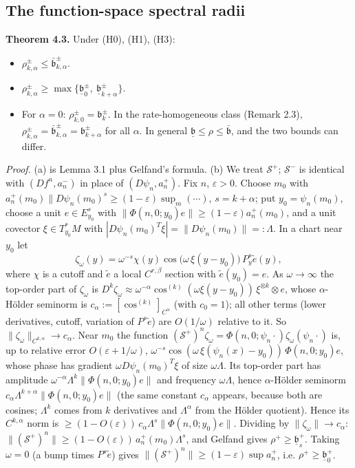 \documentclass[11pt,a4paper]{article}
\theoremstyle{plain}
\theoremstyle{definition}
\theoremstyle{remark}
\numberwithin{equation}{section}
\numberwithin{figure}{section}
\begin{document}
\subsection{The function-space spectral radii}

\textbf{Theorem 4.3.} Under (H0), (H1), (H3):
\begin{itemize}
    \item[(a)] $\rho^\pm_{k,\alpha}\le\bar{\mathfrak b}^\pm_{k,\alpha}$.
    \item[(b)] $\rho^\pm_{k,\alpha}\ge\max\{\underline{\mathfrak b}^\pm_0,\ \underline{\mathfrak b}^\pm_{k+\alpha}\}$.
    \item[(c)] For $\alpha=0$: $\rho^\pm_{k,0}=\mathfrak b^\pm_k$. In the rate-homogeneous class (Remark 2.3), $\rho^\pm_{k,\alpha}=\bar{\mathfrak b}^\pm_{k,\alpha}=\mathfrak b^\pm_{k+\alpha}$ for all $\alpha$. In general $\underline{\mathfrak b}\le\rho\le\bar{\mathfrak b}$, and the two bounds can differ.
\end{itemize}

\textit{Proof.} (a) is Lemma 3.1 plus Gelfand's formula. (b) We treat $\mathcal S^+$; $\mathcal S^-$ is identical with $(Df^n,a^-_n)$ in place of $(D\psi_n,a^+_n)$. Fix $n$, $\varepsilon>0$. Choose $m_0$ with $a^+_n(m_0)\|D\psi_n(m_0)^s\ge(1-\varepsilon)\sup_m(\cdots)$, $s=k+\alpha$; put $y_0=\psi_n(m_0)$, choose a unit $e\in E^s_{y_0}$ with $\|\Phi(n,0;y_0)e\|\ge(1-\varepsilon)a^+_n(m_0)$, and a unit covector $\xi\in T^*_{y_0}M$ with $|D\psi_n(m_0)^{T}\xi|=\|D\psi_n(m_0)\|=:\Lambda$. In a chart near $y_0$ let
\[
\zeta_\omega(y)=\omega^{-s}\chi(y)\cos\big(\omega\,\xi(y-y_0)\big)\,P^s_y\tilde e(y),
\]
where $\chi$ is a cutoff and $\tilde e$ a local $C^{r,\beta}$ section with $\tilde e(y_0)=e$. As $\omega\to\infty$ the top-order part of $\zeta_\omega$ is $D^k\zeta_\omega\approx\omega^{-\alpha}\cos^{(k)}(\omega\xi(y-y_0))\,\xi^{\otimes k}\otimes e$, whose $\alpha$-Hölder seminorm is $c_\alpha:=[\cos^{(k)}]_{C^\alpha}$ (with $c_0=1$); all other terms (lower derivatives, cutoff, variation of $P^s\tilde e$) are $O(1/\omega)$ relative to it. So $\|\zeta_\omega\|_{C^{k,\alpha}}\to c_\alpha$. Near $m_0$ the function $(\mathcal S^+)^n\zeta_\omega=\Phi(n,0;\psi_n\cdot)\zeta_\omega(\psi_n\cdot)$ is, up to relative error $O(\varepsilon+1/\omega)$, $\omega^{-s}\cos(\omega\,\xi(\psi_n(x)-y_0))\,\Phi(n,0;y_0)e$, whose phase has gradient $\omega D\psi_n(m_0)^T\xi$ of size $\omega\Lambda$. Its top-order part has amplitude $\omega^{-\alpha}\Lambda^k\|\Phi(n,0;y_0)e\|$ and frequency $\omega\Lambda$, hence $\alpha$-Hölder seminorm $c_\alpha\Lambda^{k+\alpha}\|\Phi(n,0;y_0)e\|$ (the same constant $c_\alpha$ appears, because both are cosines; $\Lambda^k$ comes from $k$ derivatives and $\Lambda^\alpha$ from the Hölder quotient). Hence its $C^{k,\alpha}$ norm is $\ge(1-O(\varepsilon))\,c_\alpha\Lambda^{s}\|\Phi(n,0;y_0)e\|$. Dividing by $\|\zeta_\omega\|\to c_\alpha$: $\|(\mathcal S^+)^n\|\ge(1-O(\varepsilon))\,a^+_n(m_0)\Lambda^{s}$, and Gelfand gives $\rho^+\ge\underline{\mathfrak b}^+_s$. Taking $\omega=0$ (a bump times $P^s\tilde e$) gives $\|(\mathcal S^+)^n\|\ge(1-\varepsilon)\sup a^+_n$, i.e. $\rho^+\ge\underline{\mathfrak b}^+_0$.
\end{document}
